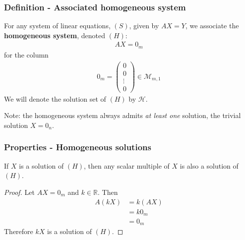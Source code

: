 \documentclass[usenames,dvipsnames,aspectratio=169,10pt]{beamer}
\numberwithin{equation}{section}
\begin{document}
\begin{frame}
\frametitle{Definition - Associated homogeneous system}

For any system of linear equations, $(S)$, given by $AX=Y$, we associate the \textbf{homogeneous system}, denoted $(H)$:
\begin{align*}
 AX = 0_m
\end{align*} 
for the column
\begin{align*}
0_m = \begin{pmatrix} 0 \\ 0 \\ \vdots \\ 0 \end{pmatrix} \in \mathcal{M}_{m,1}
\end{align*}
We will denote the solution set of $(H)$ by $\mathcal{H}$.

Note: the homogeneous system always admits \textit{at least one} solution, the trivial solution $X=0_n$.
\end{frame}





\begin{frame}
\frametitle{Properties - Homogeneous solutions}

If $X$ is a solution of $(H)$, then any scalar multiple of $X$ is also a solution of $(H)$.

\begin{proof}
Let $AX=0_m$ and $k\in\mathbb{R}$. Then
\begin{align*}
A(kX) &= k(AX) \\
&=k0_m \\
&=0_m 
\end{align*}
Therefore $kX$ is a solution of $(H)$.
\end{proof}
\end{frame}
\end{document}

